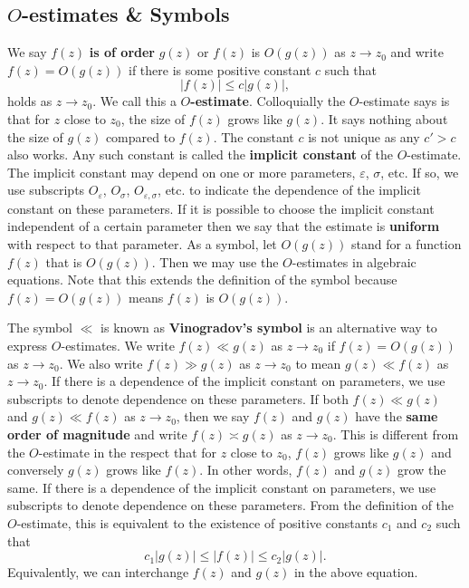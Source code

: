 \documentclass[12pt]{book}
\theoremstyle{definition}\newframedtheorem{method}{Method}
\newcommand{\s}{\sigma}
\newcommand{\e}{\varepsilon}
\newcommand{\<}{\langle}
\renewcommand{\>}{\rangle}
\begin{document}
    \subsection*{\texorpdfstring{$O$}{O}-estimates \& Symbols}
      We say $f(z)$ \textbf{is of order} $g(z)$ or $f(z)$ is $O(g(z))$ as $z \to z_{0}$ and write $f(z) = O(g(z))$
      if there is some positive constant $c$ such that
      \[
        |f(z)| \le c|g(z)|,
      \]
      holds as $z \to z_{0}$. We call this a \textbf{$O$-estimate}. Colloquially the $O$-estimate says is that for $z$ close to $z_{0}$, the size of $f(z)$ grows like $g(z)$. It says nothing about the size of $g(z)$ compared to $f(z)$. The constant $c$ is not unique as any $c' > c$ also works. Any such constant is called the \textbf{implicit constant} of the $O$-estimate. The implicit constant may depend on one or more parameters, $\e$, $\s$, etc. If so, we use subscripts $O_{\e}$, $O_{\s}$, $O_{\e,\s}$, etc. to indicate the dependence of the implicit constant on these parameters. If it is possible to choose the implicit constant independent of a certain parameter then we say that the estimate is \textbf{uniform} with respect to that parameter. As a symbol, let $O(g(z))$ stand for a function $f(z)$ that is $O(g(z))$. Then we may use the $O$-estimates in algebraic equations. Note that this extends the definition of the symbol because $f(z) = O(g(z))$ means $f(z)$ is $O(g(z))$.

      The symbol $\ll$ is known as \textbf{Vinogradov's symbol} is an alternative way to express $O$-estimates. We write $f(z) \ll g(z)$ as $z \to z_{0}$ if $f(z) = O(g(z))$ as $z \to z_{0}$. We also write $f(z) \gg g(z)$ as $z \to z_{0}$ to mean $g(z) \ll f(z)$ as $z \to z_{0}$. If there is a dependence of the implicit constant on parameters, we use subscripts to denote dependence on these parameters. If both $f(z) \ll g(z)$ and $g(z) \ll f(z)$ as $z \to z_{0}$, then we say $f(z)$ and $g(z)$ have the \textbf{same order of magnitude} and write $f(z) \asymp g(z)$ as $z \to z_{0}$. This is different from the $O$-estimate in the respect that for $z$ close to $z_{0}$, $f(z)$ grows like $g(z)$ and conversely $g(z)$ grows like $f(z)$. In other words, $f(z)$ and $g(z)$ grow the same. If there is a dependence of the implicit constant on parameters, we use subscripts to denote dependence on these parameters. From the definition of the $O$-estimate, this is equivalent to the existence of positive constants $c_{1}$ and $c_{2}$ such that
      \[
        c_{1}|g(z)| \le |f(z)| \le c_{2}|g(z)|.
      \]
      Equivalently, we can interchange $f(z)$ and $g(z)$ in the above equation.
\end{document}

